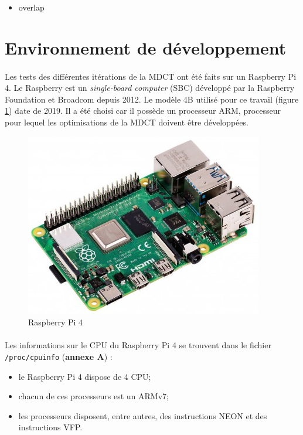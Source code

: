 \documentclass{article}
\begin{document}
    \begin{itemize}
        \item overlap
    \end{itemize}



    \newpage
    \section{Environnement de développement}

    \paragraph{}
    Les tests des différentes itérations de la MDCT ont été faits sur un Raspberry Pi 4. Le Raspberry est un \emph{single-board computer} (SBC) développé par la Raspberry Foundation et Broadcom depuis 2012. Le modèle 4B utilisé pour ce travail (figure \ref{fig:raspberry}) date de 2019. Il a été choisi car il possède un processeur ARM, processeur pour lequel les optimisations de la MDCT doivent être développées\cite{raspberry-doc}.

    \begin{figure}[H]
        \centering
        \includegraphics[width=.4\linewidth]{./images/raspberry.png}
        \caption{Raspberry Pi 4}
        \label{fig:raspberry}
    \end{figure}

    \paragraph{}
    Les informations sur le CPU du Raspberry Pi 4 se trouvent dans le fichier \texttt{/proc/cpuinfo} (\textbf{annexe A}) :
    \begin{itemize}
        \item le Raspberry Pi 4 dispose de 4 CPU;
        \item chacun de ces processeurs est un ARMv7;
        \item les processeurs disposent, entre autres, des instructions NEON et des instructions VFP.
    \end{itemize}
\end{document}

